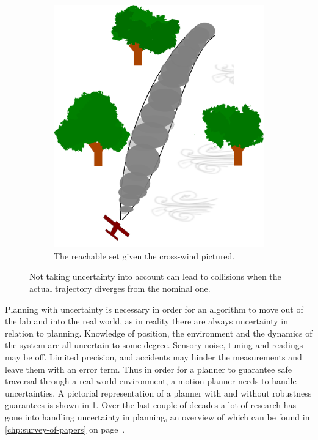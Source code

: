 \begin{figure}
\begin{subfigure}{0.4\textwidth}
    \includegraphics[width=.95\textwidth]{figures/experiments/experiment-setup-funnel}
    \caption{The reachable set given the cross-wind pictured.\newline}
  \end{subfigure}
  \caption[Airplane model in a cross-wind]{Not taking uncertainty into account can lead to collisions when the
    actual trajectory diverges from the nominal one.}
  \label{fig:motion-planning-uncertainty}
\end{figure}

Planning with uncertainty is necessary in order for an algorithm to move out of
the lab and into the real world, as in reality there are always uncertainty in
relation to planning. Knowledge of position, the environment and the dynamics of
the system are all uncertain to some degree. Sensory noise, tuning and readings
may be off. Limited precision, and accidents may hinder the measurements and
leave them with an error term. Thus in order for a planner to guarantee safe
traversal through a real world environment, a motion planner needs to handle
uncertainties. A pictorial representation of a planner with and without
robustness guarantees is shown in \cref{fig:motion-planning-uncertainty}. Over
the last couple of decades a lot of research has gone into handling uncertainty
in planning, an overview of which can be found in \cref{chp:survey-of-papers} on
page~\pageref{chp:survey-of-papers}.

